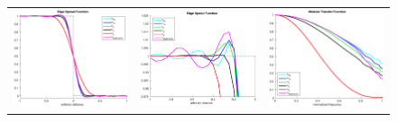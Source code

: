 \begin{figure}[h]
\begin{tabular}{ccc}
\includegraphics[scale=0.3]{ESF}
& \includegraphics[scale=0.3]{ESF_zoom}
& \includegraphics[scale=0.3]{MTF}

\end{tabular}
\end{figure}
